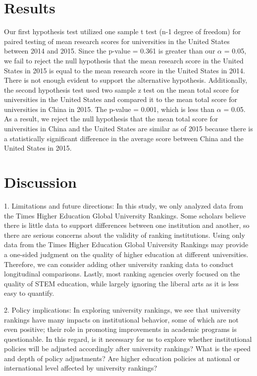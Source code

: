 \documentclass[a4paper]{article}
\begin{document}
\section* {Results}
Our first hypothesis test utilized one sample t test (n-1 degree of freedom) for paired testing of mean research scores for universities in the United States between 2014 and 2015. Since the p-value = 0.361 is greater than our $\alpha$ = 0.05, we fail to reject the null hypothesis that the mean research score in the United States in 2015 is equal to the mean research score in the United States in 2014. There is not enough evident to support the alternative hypothesis. \newline Additionally, the second hypothesis test used two sample z test on the mean total score for universities in the  United States and compared it to the mean total score for universities in China in 2015. The p-value = 0.001, which is less than $\alpha$ = 0.05. As a result, we reject the null hypothesis that the mean total score for universities in China and the United States are similar as of 2015 because there is a statistically significant difference in the average score between China and the United States in 2015.

\section*{Discussion}
1. Limitations and future directions: In this study, we only analyzed data from the Times Higher Education Global University Rankings. Some scholars believe there is little data to support differences between one institution and another, so there are serious concerns about the validity of ranking institutions\cite{davis_2016}. Using only data from the Times Higher Education Global University Rankings may provide a one-sided judgment on the quality of higher education at different universities. Therefore, we can consider adding other university ranking data to conduct longitudinal comparisons. Lastly, most ranking agencies overly focused on the quality of STEM education, while largely ignoring the liberal arts as it is less easy to quantify.

2. Policy implications: In exploring university rankings, we see that university rankings have many impacts on institutional behavior, some of which are not even positive; their role in promoting improvements in academic programs is questionable. In this regard, is it necessary for us to explore whether institutional policies will be adjusted accordingly after university rankings? What is the speed and depth of policy adjustments? Are higher education policies at national or international level affected by university rankings?
\end{document}
